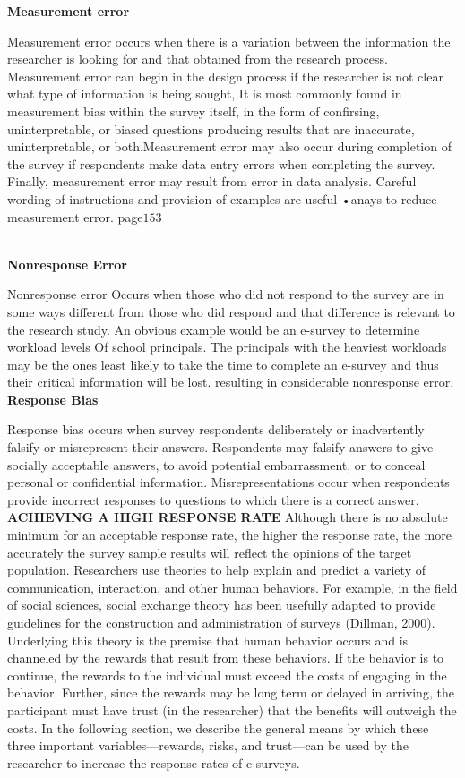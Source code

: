 \documentclass{book}
\begin{document}
\textbf{Measurement error}\par Measurement error occurs when there is a variation between the information the researcher is looking for and that obtained from the research process. Measurement error can begin in the design process if the researcher is not clear what type of information is being sought, It is most commonly found in measurement bias within the survey itself, in the form of confirsing, uninterpretable, or biased questions producing results that are inaccurate, uninterpretable, or both.Measurement error may also occur during completion of the survey if respondents make data entry errors when completing the survey. Finally, measurement error may result from error in data analysis. Careful wording of instructions and provision of examples are useful •anays to reduce measurement error. \newpage
page$153$\\\\\par
\textbf{Nonresponse Error}\par  Nonresponse error Occurs when those who did not respond to the survey are in some ways different from those who did respond and that difference is relevant to the research study. An obvious example would be an e-survey to determine workload levels Of school principals. The principals with the heaviest workloads may be the ones least likely to take the time to complete an e-survey and thus their critical information will be lost. resulting in considerable nonresponse error.\\
\textbf{Response Bias}\par  Response bias occurs when survey respondents deliberately or inadvertently falsify or misrepresent their answers. Respondents may falsify answers to give socially acceptable answers, to avoid potential embarrassment, or to conceal personal or confidential information. Misrepresentations occur when respondents provide incorrect responses to questions to which there is a correct answer.\\
\textbf{ACHIEVING A HIGH RESPONSE RATE}  Although there is no absolute minimum for an acceptable response rate, the higher the response rate, the more accurately the survey sample results will reflect the opinions of the target population. Researchers use theories to help explain and predict a variety of communication, interaction, and other human behaviors. For example, in the field of social sciences, social exchange theory has been usefully adapted to provide guidelines for the construction and administration of surveys (Dillman, 2000). Underlying this theory is the premise that human behavior occurs and is channeled by the rewards that result from these behaviors. If the behavior is to continue, the rewards to the individual must exceed the costs of engaging in the behavior. Further, since the rewards may be long term or delayed in arriving, the participant must have trust (in the researcher) that the benefits will outweigh the costs. In the following section, we describe the general means by which these three important variables—rewards, risks, and trust—can be used by the researcher to increase the response rates of e-surveys.\\
\end{document}
